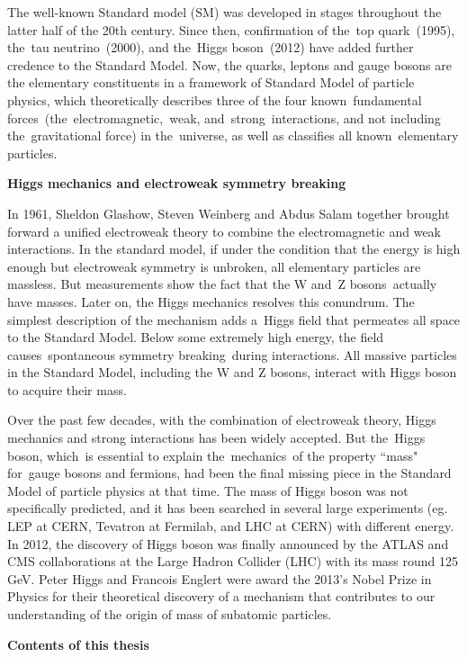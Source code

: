 The well-known Standard model (SM) was developed in stages throughout the latter half of the 20th century. 
Since then, confirmation of the top quark (1995), the tau neutrino (2000), and the Higgs boson (2012) have added further credence to the Standard Model.
Now, the quarks, leptons and gauge bosons are the elementary constituents in a framework of Standard Model of particle physics, 
which theoretically describes three of the four known fundamental forces (the electromagnetic, weak, and strong interactions, and not including the gravitational force) in the universe, 
as well as classifies all known elementary particles.

\textbf{Higgs mechanics and electroweak symmetry breaking}

In 1961, Sheldon Glashow, Steven Weinberg and Abdus Salam together brought forward a unified electroweak theory to combine the electromagnetic and weak interactions. 
In the standard model, if under the condition that the energy is high enough but electroweak symmetry is unbroken, all elementary particles are massless. 
But measurements show the fact that the W and Z bosons actually have masses. 
Later on, the Higgs mechanics resolves this conundrum. 
The simplest description of the mechanism adds a Higgs field that permeates all space to the Standard Model. 
Below some extremely high energy, the field causes spontaneous symmetry breaking during interactions. 
All massive particles in the Standard Model, including the W and Z bosons, interact with Higgs boson to acquire their mass.

Over the past few decades, with the combination of electroweak theory, Higgs mechanics and strong interactions has been widely accepted. 
But the Higgs boson, which is essential to explain the mechanics of the property ``mass" for gauge bosons and fermions, had been the final missing piece in the Standard Model of particle physics at that time. 
The mass of Higgs boson was not specifically predicted, and it has been searched in several large experiments (eg. LEP at CERN, Tevatron at Fermilab, and LHC at CERN) with different energy. 
In 2012, the discovery of Higgs boson was finally announced by the ATLAS and CMS collaborations at the Large Hadron Collider (LHC) with its mass round 125 GeV. 
Peter Higgs and Francois Englert were award the 2013's Nobel Prize in Physics for their theoretical discovery of a mechanism that contributes to our understanding of the origin of mass of subatomic particles.

\textbf{Contents of this thesis}

